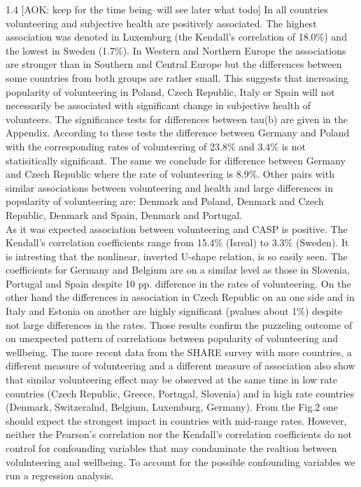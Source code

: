 \documentclass[10pt, letterpaper]{article}
\begin{document}
\begin{spacing}{1.4}
[AOK: keep for the time being--will see later what todo]
In all countries volunteering and subjective health are positively associated. The highest association was denoted in Luxemburg (the Kendall's correlation of 18.0\%) and the lowest in Sweden (1.7\%). In Western and Northern Europe the associations are stronger than in Southern and Central Europe but the differences between some countries from both groups are rather small. This suggests that increasing popularity of volunteering in Poland, Czech Republic, Italy or Spain will not necessarily be associated with significant change in subjective health of volunteers. The significance tests for differences between tau(b) are given in the Appendix. According to these tests the difference between Germany and Poland with the corresponding rates of volunteering of 23.8\% and 3.4\% is not statisitically significant. The same we conclude for difference between Germany and Czech Republic where the rate of volunteering is 8.9\%. Other pairs with similar associations between volunteering and health and large differences in popularity of volunteering are: Denmark and Poland, Denmark and Czech Republic, Denmark and Spain, Denmark and Portugal.  \\

As it was expected association between volunteering and CASP  is positive. The Kendall's correlation coefficients range from 15.4\% (Isreal) to 3.3\% (Sweden).  It is intresting that the nonlinear, inverted U-shape relation, is so easily seen. The coefficients for Germany and Belgium are on a similar level as those in Slovenia, Portugal and Spain despite 10 pp. difference in the rates of volunteering. On the other hand the differences in association in Czech Republic on an one side and in Italy and Estonia on another are highly significant (pvalues about 1\%) despite not large differences in the rates. Those results confirm the puzzeling outcome of \citet{haski09} on unexpected pattern of correlations between  popularity of volunteering and wellbeing.  The more recent data from the SHARE survey with more countries, a different measure of volunteering and a different measure of association also show that similar volunteering effect may be observed at the same time in low rate countries (Czech Republic, Greece, Portugal, Slovenia) and in high rate countries (Denmark, Switzeralnd, Belgium, Luxemburg, Germany). From the Fig.2 one should expect the strongest impact in countries with mid-range rates. However, neither the Pearson's correlation  nor the Kendall's correlation coefficients  do not control for confounding variables that may condaminate the realtion between volulnteering and wellbeing. To account for the possible confounding variables we run a regression analysis.   



\end{spacing}
\end{document}
